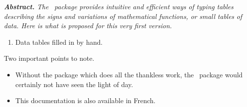 \documentclass[10pt, a4paper]{article}
\begin{document}
{\noindent
\small\itshape
\textbf{Abstract.}
The \thispack\ package provides intuitive and efficient ways of typing tables describing the signs and variations of mathematical functions, or small tables of data. %
Here is what is proposed for this very first version.
\begin{enumerate}
	\item Data tables filled in by hand.%

%
%
\end{enumerate}

\medskip

\noindent
Two important points to note.
\begin{itemize}
    \item Without the  package which does all the thankless work, the \thispack\ package would certainly not have seen the light of day.

    \item This documentation is also available in French.
\end{itemize}
}
\end{document}
